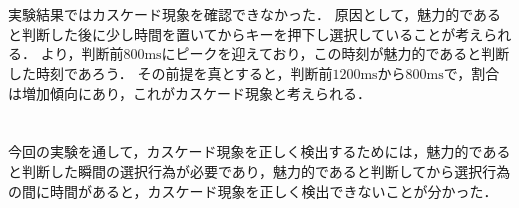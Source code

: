 \section{\consideration}
実験結果ではカスケード現象を確認できなかった．
原因として，魅力的であると判断した後に少し時間を置いてからキーを押下し選択していることが考えられる．
より，判断前\(800\textrm{ms}\)にピークを迎えており，この時刻が魅力的であると判断した時刻であろう．
その前提を真とすると，判断前\(1200\textrm{ms}\)から\(800\textrm{ms}\)で，割合は増加傾向にあり，これがカスケード現象と考えられる．
\section{\conclusion}
今回の実験を通して，カスケード現象を正しく検出するためには，魅力的であると判断した瞬間の選択行為が必要であり，魅力的であると判断してから選択行為の間に時間があると，カスケード現象を正しく検出できないことが分かった．

